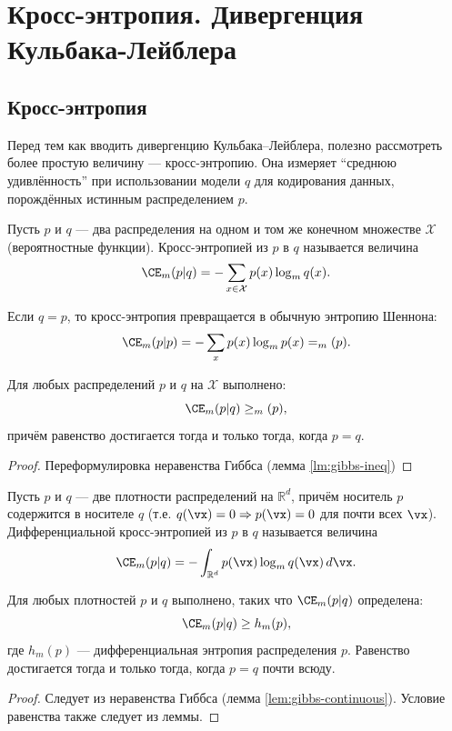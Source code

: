 \section{Кросс-энтропия. Дивергенция Кульбака-Лейблера}
\localtableofcontents

\subsection{Кросс-энтропия}

Перед тем как вводить дивергенцию Кульбака–Лейблера, полезно рассмотреть более простую величину --- кросс-энтропию. Она измеряет \enquote{среднюю удивлённость} при использовании модели $q$ для кодирования данных, порождённых истинным распределением $p$.

\begin{definition}
	Пусть $p$ и $q$ --- два распределения на одном и том же конечном множестве $\mathcal{X}$ (вероятностные функции). Кросс-энтропией из $p$ в $q$ называется величина
	\[
		\CE_m(p | q) = -\sum_{x \in \mathcal{X}} p(x) \log_m q(x).
	\]
\end{definition}

\begin{remark}
	Если $q = p$, то кросс-энтропия превращается в обычную энтропию Шеннона:
	\[
		\CE_m(p | p) = -\sum_x p(x) \log_m p(x) = \H_m(p).
	\]
\end{remark}

\begin{proposition}
	\label{prop:cross-entropy-min}
	Для любых распределений $p$ и $q$ на $\mathcal{X}$ выполнено:
	\[
		\CE_m(p | q) \geq \H_m(p),
	\]
	причём равенство достигается тогда и только тогда, когда $p = q$.
\end{proposition}
\begin{proof}
	Переформулировка неравенства Гиббса (лемма \ref{lm:gibbs-ineq}) 
\end{proof}

\begin{definition}
	Пусть $p$ и $q$ --- две плотности распределений на $\mathbb{R}^d$, причём носитель $p$ содержится в носителе $q$ (т.е. $q(\vx) = 0 \Rightarrow p(\vx) = 0$ для почти всех $\vx$). Дифференциальной кросс-энтропией из $p$ в $q$ называется величина
	\[
		\CE_m(p | q) = -\int_{\mathbb{R}^d} p(\vx) \log_m q(\vx) \, d\vx.
	\]
\end{definition}
\begin{proposition}
	\label{prop:diff-cross-entropy-gibbs}
	Для любых плотностей $p$ и $q$ выполнено, таких что $\CE_m(p | q)$ определена:
	\[
		\CE_m(p | q) \geq h_m(p),
	\]
	где $h_m(p)$ --- дифференциальная энтропия распределения $p$. Равенство достигается тогда и только тогда, когда $p = q$ почти всюду.
\end{proposition}
\begin{proof}
	Следует из неравенства Гиббса (лемма \ref{lem:gibbs-continuous}). Условие равенства также следует из леммы.
\end{proof}


